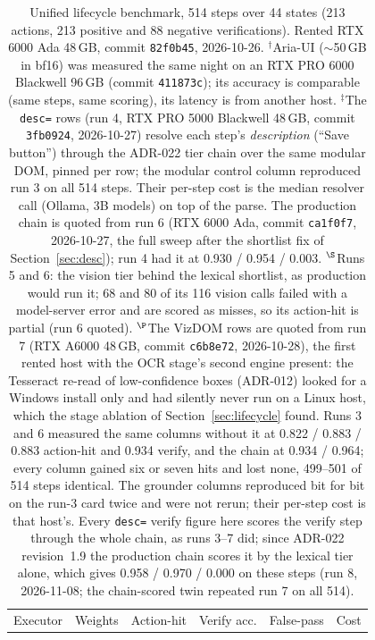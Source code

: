 \documentclass[11pt,a4paper]{article}
\newcommand{\code}[1]{\texttt{#1}}
\begin{document}
\begin{table}[H]
  \centering\footnotesize
  \caption{Unified lifecycle benchmark, 514 steps over 44 states (213 actions, 213
  positive and 88 negative verifications). Rented RTX 6000 Ada 48\,GB, commit
  \code{82f0b45}, 2026-10-26. $^\dagger$Aria-UI ($\sim$50\,GB in bf16) was measured the
  same night on an RTX PRO 6000 Blackwell 96\,GB (commit \code{411873c}); its accuracy
  is comparable (same steps, same scoring), its latency is from another host.
  $^\ddagger$The \code{desc=} rows (run 4, RTX PRO 5000 Blackwell 48\,GB, commit
  \code{3fb0924}, 2026-10-27) resolve each step's \emph{description} (``Save button'')
  through the ADR-022 tier chain over the same modular DOM, pinned per row; the
  modular control column reproduced run 3 on all 514 steps. Their per-step cost is the
  median resolver call (Ollama, 3B models) on top of the parse. The production chain
  is quoted from run 6 (RTX 6000 Ada, commit \code{ca1f0f7}, 2026-10-27, the full sweep
  after the shortlist fix of Section~\ref{sec:desc}); run 4 had it at
  0.930 / 0.954 / 0.003. $^\S$Runs 5 and 6: the vision tier behind the lexical
  shortlist, as production would run it; 68 and 80 of its 116 vision calls failed with
  a model-server error and are scored as misses, so its action-hit is partial (run 6
  quoted). $^\P$The VizDOM rows are quoted from run 7 (RTX A6000 48\,GB, commit
  \code{c6b8e72}, 2026-10-28), the first rented host with the OCR stage's second engine
  present: the Tesseract re-read of low-confidence boxes (ADR-012) looked for a Windows
  install only and had silently never run on a Linux host, which the stage ablation of
  Section~\ref{sec:lifecycle} found. Runs 3 and 6 measured the same columns without it
  at 0.822 / 0.883 / 0.883 action-hit and 0.934 verify, and the chain at 0.934 / 0.964;
  every column gained six or seven hits and lost none, 499--501 of 514 steps identical.
  The grounder columns reproduced bit for bit on the run-3 card twice and were not rerun;
  their per-step cost is that host's. Every \code{desc=} verify figure here scores the
  verify step through the whole chain, as runs 3--7 did; since ADR-022 revision~1.9 the
  production chain scores it by the lexical tier alone, which gives 0.958 / 0.970 / 0.000
  on these steps (run 8, 2026-11-08; the chain-scored twin repeated run 7 on all 514).}
  \label{tab:lifecycle}
  \begin{tabular}{@{}p{3.4cm}p{2.5cm}cccp{2.6cm}@{}}
    \toprule
    Executor & Weights & Action-hit & Verify acc. & False-pass & Cost \\

\end{tabular}
\end{table}
\end{document}
